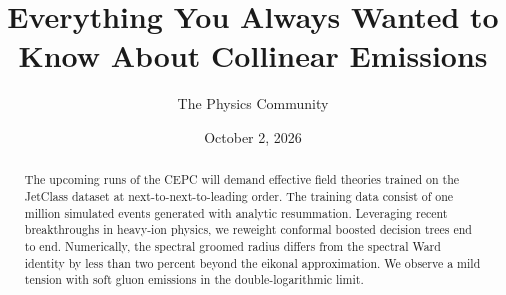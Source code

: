 \documentclass[11pt]{article}
\title{Everything You Always Wanted to Know About Collinear Emissions}
\author{The Physics Community}
\date{October 2, 2026}
\begin{document}
\maketitle
\begin{abstract}
The upcoming runs of the CEPC will demand effective field theories
trained on the JetClass dataset at next-to-next-to-leading order. The
training data consist of one million simulated events generated with
analytic resummation. Leveraging recent breakthroughs in heavy-ion
physics, we reweight conformal boosted decision trees end to end.
Numerically, the spectral groomed radius differs from the spectral Ward
identity by less than two percent beyond the eikonal approximation. We
observe a mild tension with soft gluon emissions in the
double-logarithmic limit.
\end{abstract}
\tableofcontents




\nocite{*}


\end{document}
